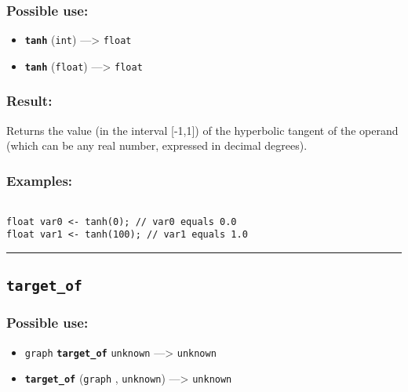\documentclass[]{book}
\providecommand{\tightlist}{%
  \setlength{\itemsep}{0pt}\setlength{\parskip}{0pt}}
\theoremstyle{definition}
\theoremstyle{definition}
\theoremstyle{definition}
\theoremstyle{remark}
\begin{document}
\subsubsection{Possible use:}\label{possible-use-514}

\begin{itemize}
\tightlist
\item
  \textbf{\texttt{tanh}} (\texttt{int}) ---\textgreater{} \texttt{float}
\item
  \textbf{\texttt{tanh}} (\texttt{float}) ---\textgreater{}
  \texttt{float}
\end{itemize}

\subsubsection{Result:}\label{result-497}

Returns the value (in the interval {[}-1,1{]}) of the hyperbolic tangent
of the operand (which can be any real number, expressed in decimal
degrees).

\subsubsection{Examples:}\label{examples-355}

\begin{verbatim}
 
float var0 <- tanh(0); // var0 equals 0.0 
float var1 <- tanh(100); // var1 equals 1.0
\end{verbatim}

\begin{center}\rule{0.5\linewidth}{\linethickness}\end{center}

\subsection{\texorpdfstring{\texttt{target\_of}}{target\_of}}\label{target_of}

\subsubsection{Possible use:}\label{possible-use-515}

\begin{itemize}
\tightlist
\item
  \texttt{graph} \textbf{\texttt{target\_of}} \texttt{unknown}
  ---\textgreater{} \texttt{unknown}
\item
  \textbf{\texttt{target\_of}} (\texttt{graph} , \texttt{unknown})
  ---\textgreater{} \texttt{unknown}
\end{itemize}
\end{document}
